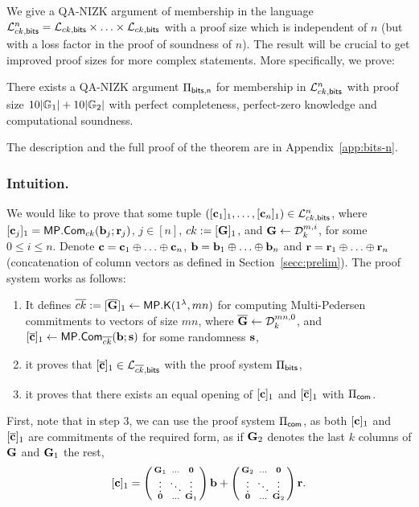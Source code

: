 We give a QA-NIZK argument of membership in the language $\mathcal{L}_{ck,\mathsf{bits}}^n  = \mathcal{L}_{ck,\mathsf{bits}} \times \ldots \times \mathcal{L}_{ck,\mathsf{bits}}$ with a proof size which is independent of $n$ (but with a loss factor in the proof of soundness of $n$). The result will be crucial to get improved proof sizes for more complex statements. More specifically, we prove: 


\begin{theorem} \label{theo:bitsnm} There exists a QA-NIZK argument $\Pi_{\mathsf{bits,n}}$  for membership in $\mathcal{L}_{ck,\mathsf{bits}}^n$ with proof size  
$10|\mathbb{G}_1|+10|\mathbb{G}_2|$ with perfect completeness, perfect-zero knowledge and computational soundness. 
\end{theorem}

The description and the full proof of the theorem are in Appendix~\ref{app:bits-n}. 

\subsubsection{Intuition.} We would like to prove that some tuple
$([\mathbf{c}_1]_1,\ldots, [\mathbf{c}_n]_1) \in \mathcal{L}_{ck,\mathsf{bits}}^n$, where $[\mathbf{c}_j]_1=\mathsf{MP}.\mathsf{Com}_{ck}(\mathbf{b}_j;\mathbf{r}_j)$, $j \in [n]$, $ck:=[\mathbf{{G}}]_1$, and $\mathbf{{G}} \gets \mathcal{D}_k^{m,i}$, for some $0 \leq i \leq n$. 
Denote $\mathbf{c}=\mathbf{c}_1 \oplus \ldots \oplus \mathbf{c}_n$, $\mathbf{b}=\mathbf{b}_1 \oplus \ldots \oplus \mathbf{b}_n$ and $\mathbf{r}=\mathbf{r}_1 \oplus \ldots \oplus \mathbf{r}_n$ (concatenation of column vectors as defined in Section~\ref{secc:prelim}). The proof system works as follows:
\begin{enumerate}
\item It defines  
 $\overline{ck}:=[\overline{\mathbf{{G}}}]_1\gets\mathsf{MP}.\mathsf{K}(1^\lambda,mn)$ for computing Multi-Pedersen commitments to vectors of size $mn$, where $\overline{\mathbf{{G}}} \leftarrow 
\mathcal{D}_k^{mn,0}$, and  $[{\overline{\mathbf{c}}}]_1\gets\mathsf{MP}.\mathsf{Com}_{\overline{ck}}(\mathbf{b};\mathbf{s})$ for some 
randomness $\mathbf{s}$, 
\item it proves that $[{\overline{\mathbf{c}}}]_1\in\mathcal{L}_{\overline{ck},\mathsf{bits}}$ with the proof system $\Pi_{\mathsf{bits}}$,
\item it  proves that there exists an equal opening of $[\mathbf{c}]_1$ and $[{\overline{\mathbf{c}}}]_1$ with  $\Pi_{\mathsf{com}}$.
\end{enumerate}
First, note that in step 3, we can use the proof system $\Pi_{\mathsf{com}}$, as both $[\mathbf{c}]_1$ and $[{\overline{\mathbf{c}}}]_1$ are commitments of the required form, as if $\mathbf{{G}}_2$ denotes the last $k$ columns 
of $\mathbf{{G}}$ and $\mathbf{{G}}_1$ the rest,
$$[\mathbf{c}]_1=\left(\begin{smallmatrix}
\mathbf{{G}}_1 & \ldots & \mathbf{0}  \\
\vdots     & \ddots & \vdots  \\
\mathbf{0}   & \ldots & \mathbf{{G}}_1
\end{smallmatrix}\right) \mathbf{b}+ \left(\begin{smallmatrix}
 \mathbf{{G}}_{2} & \ldots & \mathbf{0}\\
 \vdots         & \ddots & \vdots\\
 \mathbf{0}       & \ldots & \mathbf{{G}}_{2}
\end{smallmatrix}\right) \mathbf{r}.$$

